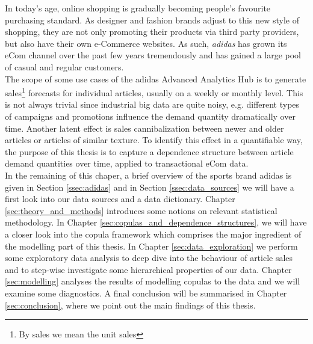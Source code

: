 

In today's age, online shopping is gradually becoming people's favourite purchasing standard. As designer and fashion brands adjust to this new style of shopping, they are not only promoting their products via third party 	providers, but also have their own e-Commerce websites. As such, \textit{adidas} has grown its eCom channel over the past few years tremendously and has gained a large pool of casual and regular customers.\\

The scope of some use cases of the adidas Advanced Analytics Hub is to generate sales\footnote{By sales we mean the unit sales} forecasts for individual articles, usually on a weekly or monthly level. This is not always trivial since industrial big data are quite noisy, e.g. different types of campaigns and promotions influence the demand quantity dramatically over time. Another latent effect is sales cannibalization between newer and older articles or articles of similar texture. To identify this effect in a quantifiable way, the purpose of this thesis is to capture a dependence structure between article demand quantities over time, applied to transactional eCom data. \\

In the remaining of this chaper, a brief overview of the sports brand adidas is given in Section \ref{ssec:adidas} and in Section \ref{ssec:data_sources} we will have a first look into our data sources and a data dictionary. Chapter \ref{sec:theory_and_methods} introduces some notions on relevant statistical methodology. In Chapter \ref{sec:copulas_and_dependence_structures}, we will have a closer look into the copula framework which comprises the major ingredient of the modelling part of this thesis. In Chapter \ref{sec:data_exploration} we perform some exploratory data analysis to deep dive into the behaviour of article sales and to step-wise investigate some hierarchical properties of our data.  Chapter \ref{sec:modelling} analyses the results of modelling copulas to the data and we will examine some diagnostics. A final conclusion will be summarised in Chapter \ref{sec:conclusion}, where we point out the main findings of this thesis.




